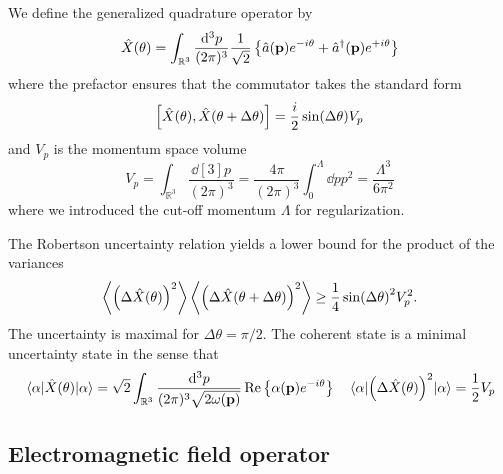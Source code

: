We define the generalized quadrature operator by 
\begin{equation}
	\hat{X}(\theta)
	=
	\int_{\mathbb{R}^3}
	\frac{\dd[3]{p}}{(2\pi)^3}
	\frac{1}{\sqrt{2}}
	\left\{
		\hat{a}(\vb{p})
		e^{-i\theta}
		+
		\hat{a}^\dagger(\vb{p})
		e^{+i\theta}
	\right\}
\end{equation}
where the prefactor ensures that the commutator takes the standard form
\begin{equation}
	\comm{\hat{X}(\theta)}{\hat{X}(\theta+\Delta\theta)}
	=
	\frac{i}{2}
	\sin(\Delta\theta)
	V_p
\end{equation}
and $V_p$ is the momentum space volume
\begin{equation}
	V_p
	=
	\int_{\mathbb{R}^3}\frac{\dd[3]{p}}{(2\pi)^3}
	=
	\frac{4\pi}{(2\pi)^3}
	\int_0^\Lambda\dd{p}p^2
	=
	\frac{\Lambda^3}{6\pi^2}
\end{equation}
where we introduced the cut-off momentum $\Lambda$ for regularization.

The Robertson uncertainty relation yields a lower bound for the product of the variances
\begin{equation}
	\expval{\left(\Delta\hat{X}(\theta)\right)^2}
	\expval{\left(\Delta\hat{X}(\theta+\Delta\theta)\right)^2}
	\geq
	\frac{1}{4}
	\sin(\Delta\theta)^2
	V_p^2
	.
\end{equation}
The uncertainty is maximal for $\Delta\theta=\pi/2$.
The coherent state is a minimal uncertainty state in the sense that
\begin{align}
	\expval{\hat{X}(\theta)}{\alpha}
	=
	\sqrt{2}
	\int_{\mathbb{R}^3}
	\frac{\dd[3]{p}}{(2\pi)^3\sqrt{2\omega(\vb{p})}}
	\operatorname{\operatorname{Re}}\left\{
		\alpha(\vb{p})
		e^{-i\theta}
	\right\}
	&&
	\expval{\left(\Delta\hat{X}(\theta)\right)^2}{\alpha}
	=
	\frac{1}{2}
	V_p
\end{align}

\subsection{Electromagnetic field operator}